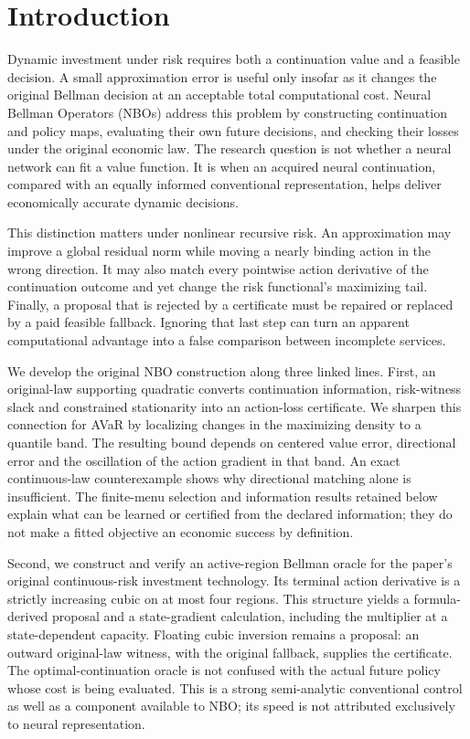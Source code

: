 \section{Introduction}\label{sec:intro109}
Dynamic investment under risk requires both a continuation value and a feasible decision. A small approximation error is useful only insofar as it changes the original Bellman decision at an acceptable total computational cost. Neural Bellman Operators (NBOs) address this problem by constructing continuation and policy maps, evaluating their own future decisions, and checking their losses under the original economic law. The research question is not whether a neural network can fit a value function. It is when an acquired neural continuation, compared with an equally informed conventional representation, helps deliver economically accurate dynamic decisions.

This distinction matters under nonlinear recursive risk. An approximation may improve a global residual norm while moving a nearly binding action in the wrong direction. It may also match every pointwise action derivative of the continuation outcome and yet change the risk functional's maximizing tail. Finally, a proposal that is rejected by a certificate must be repaired or replaced by a paid feasible fallback. Ignoring that last step can turn an apparent computational advantage into a false comparison between incomplete services.

We develop the original NBO construction along three linked lines. First, an original-law supporting quadratic converts continuation information, risk-witness slack and constrained stationarity into an action-loss certificate. We sharpen this connection for AVaR by localizing changes in the maximizing density to a quantile band. The resulting bound depends on centered value error, directional error and the oscillation of the action gradient in that band. An exact continuous-law counterexample shows why directional matching alone is insufficient. The finite-menu selection and information results retained below explain what can be learned or certified from the declared information; they do not make a fitted objective an economic success by definition.

Second, we construct and verify an active-region Bellman oracle for the paper's original continuous-risk investment technology. Its terminal action derivative is a strictly increasing cubic on at most four regions. This structure yields a formula-derived proposal and a state-gradient calculation, including the multiplier at a state-dependent capacity. Floating cubic inversion remains a proposal: an outward original-law witness, with the original fallback, supplies the certificate. The optimal-continuation oracle is not confused with the actual future policy whose cost is being evaluated. This is a strong semi-analytic conventional control as well as a component available to NBO; its speed is not attributed exclusively to neural representation.

